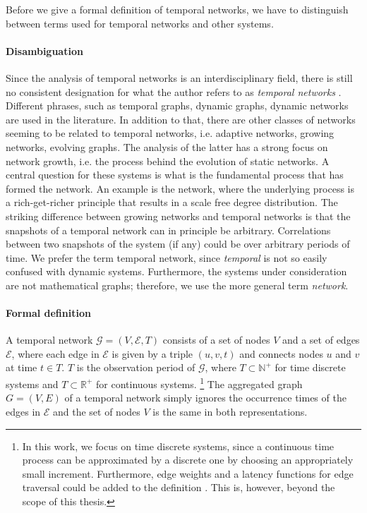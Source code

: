 Before we give a formal definition of temporal networks, we have to distinguish between terms used for temporal networks and other systems.

\paragraph{Disambiguation\color{Cayenne}{.}}
Since the analysis of temporal networks is an interdisciplinary field, there is still no consistent designation for what the author refers to as \emph{temporal networks} \citep{Holme_review}.
Different phrases, such as temporal graphs, dynamic graphs, dynamic networks are used in the literature.
In addition to that, there are other classes of networks seeming to be related to temporal networks, i.e. adaptive networks, growing networks, evolving graphs.
The analysis of the latter has a strong focus on network growth, i.e. the process behind the evolution of static networks.
A central question for these systems is what is the fundamental process that has formed the network.
An example is the \BA network, where the underlying process is a rich-get-richer principle that results in a scale free degree distribution.
The striking difference between growing networks and temporal networks is that the snapshots of a temporal network can in principle be arbitrary.
Correlations between two snapshots of the system (if any) could be over arbitrary periods of time.
We prefer the term temporal network, since \emph{temporal} is not so easily confused with dynamic systems.
Furthermore, the systems under consideration are not mathematical graphs; therefore, we use the more general term \emph{network}.

\paragraph{Formal definition\color{Cayenne}{.}}
A temporal network $\mathcal{G}=(V,\mathcal{E},T)$ consists of a set of nodes $V$ and a set of edges $\mathcal{E}$, where each edge in $\mathcal{E}$ is given by a triple $(u,v,t)$ and connects nodes $u$ and $v$ at time $t\in T$.
$T$ is the observation period of $\mathcal{G}$, where $T\subset \mathbb{N}^+$ for time discrete systems and $T\subset \mathbb{R}^+$ for continuous systems.
\footnote{
In this work, we focus on time discrete systems, since a continuous time process can be approximated by a discrete one by choosing an appropriately small increment.
Furthermore, edge weights and a latency functions for edge traversal could be added to the definition \citep{Casteights_review}.
This is, however, beyond the scope of this thesis.
}
The aggregated graph $G=(V,E)$ of a temporal network simply ignores the occurrence times of the edges in $\mathcal{E}$ and the set of nodes $V$ is the same in both representations.

